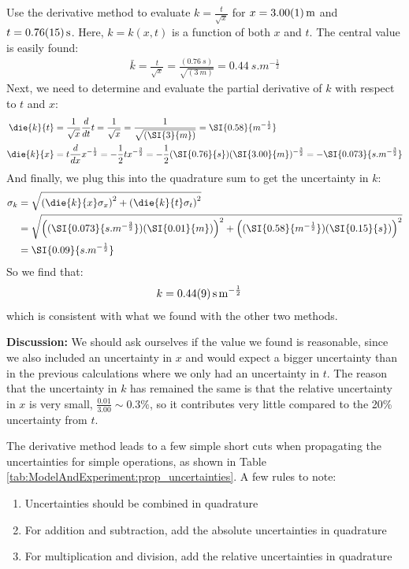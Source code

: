 \begin{example}{Use the derivative method to evaluate $k=\frac{t}{\sqrt{x}}$ for $x=\SI{3.00 \pm 0.01}{m}$ and $t=\SI{0.76\pm0.15}{s}$.}
\label{ex:ModelAndExperiment:derivprop}
Here, $k=k(x,t)$ is a function of both $x$ and $t$. The central value is easily found:
\begin{align*}
\bar k = \frac{t}{\sqrt{x}} = \frac{(\SI{0.76}{s})}{\sqrt{(\SI{3}{m})}}=\SI{0.44}{s.m^{-\frac{1}{2}}}\end{align*}
Next, we need to determine and evaluate the partial derivative of $k$ with respect to $t$ and $x$:\\
\begin{align*}
\die{k}{t}&=\frac{1}{\sqrt{x}}\frac{d}{dt}t=\frac{1}{\sqrt{x}}=\frac{1}{\sqrt{(\SI{3}{m})}}=\SI{0.58}{m^{-\frac{1}{2}}}\\
\die{k}{x}&=t\frac{d}{dx}x^{-\frac{1}{2}}=-\frac{1}{2}tx^{-\frac{3}{2}}= -\frac{1}{2}(\SI{0.76}{s})(\SI{3.00}{m})^{-\frac{3}{2}}=-\SI{0.073}{s.m^{-\frac{3}{2}}}
\end{align*}
And finally, we plug this into the quadrature sum to get the uncertainty in $k$:\\
\begin{align*}
\sigma_k&=\sqrt{\left(\die{k}{x}\sigma_x \right)^2 + \left(\die{k}{t}\sigma_t \right)^2 }\\
&= \sqrt{\left((\SI{0.073}{s.m^{-\frac{3}{2}}}) (\SI{0.01}{m}) \right)^2 + \left((\SI{0.58}{m^{-\frac{1}{2}}})(\SI{0.15}{s}) \right)^2 } \\
&=\SI{0.09}{s.m^{-\frac{1}{2}}}
\end{align*}
So we find that:
\begin{align*}
k&= \SI{0.44 \pm 0.09}{s.m^{-\frac{1}{2}}}
\end{align*}
which is consistent with what we found with the other two methods.

\textbf{Discussion:} We should ask ourselves if the value we found is reasonable, since we also included an uncertainty in $x$ and would expect a bigger uncertainty than in the previous calculations where we only had an uncertainty in $t$. The reason that the uncertainty in $k$ has remained the same is that the relative uncertainty in $x$ is very small, $\frac{0.01}{3.00}\sim 0.3\%$, so it contributes very little compared to the 20\% uncertainty from $t$. 
\end{example}

The derivative method leads to a few simple short cuts when propagating the uncertainties for simple operations, as shown in Table \ref{tab:ModelAndExperiment:prop_uncertainties}. A few rules to note:
\begin{enumerate}
\item Uncertainties should be combined in quadrature
\item For addition and subtraction, add the absolute uncertainties in quadrature
\item For multiplication and division, add the relative uncertainties in quadrature
\end{enumerate}

